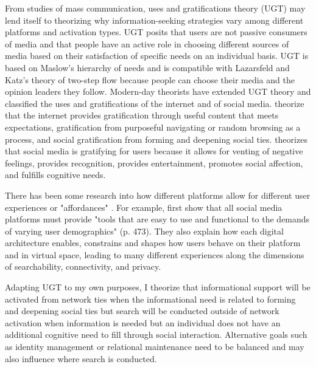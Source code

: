From studies of mass communication, uses and gratifications theory (UGT)
\citep{blumlerUsesMassCommunications1974, tanMassCommunicationTheories1985} may
lend itself to theorizing why information-seeking strategies vary among different
platforms and activation types. UGT posits that users are not passive
consumers of media and that people have an active role in choosing different
sources of media based on their satisfaction of specific needs on an individual
basis. UGT is based on Maslow's \citeyearpar{maslowTheoryHumanMotivation1943}
hierarchy of needs and is compatible with Lazarsfeld and Katz's theory of
two-step flow because people can choose their media and the opinion leaders they
follow. Modern-day theorists have extended UGT theory and classified the uses
and gratifications of the internet and of social media.
\citet{staffordDeterminingUsesGratifications2004} theorize that the internet
provides gratification through useful content that meets expectations,
gratification from purposeful navigating or random browsing as a process, and
social gratification from forming and deepening social ties.
\citet{leungGenerationalDifferencesContent2013} theorizes that social media is
gratifying for users because it allows for venting of negative feelings,
provides recognition, provides entertainment, promotes social affection, and
fulfills cognitive needs. 

There has been some research into how different platforms allow for different user 
experiences or "affordances" \citep{boyd2010social}. For example, \citet{bossetta18} first show
that all social media platforms must provide "tools that are easy to use and 
functional to the demands of varying user demographics" (p. 473). They also
explain how each digital architecture enables, constrains and shapes how users
behave on their platform and in virtual space, leading to many different experiences 
along the dimensions of searchability, connectivity, and privacy. 

Adapting UGT to my own purposes, I theorize that
informational support will be activated from network ties when the informational
need is related to forming and deepening social ties
\citep{baumeister,grieve2013face} but search will be conducted outside of network
activation when information is needed but an individual does not have an additional cognitive
need to fill through social interaction. Alternative goals such as identity
management or relational maintenance
\citep{brashersInformationSeekingAvoiding2002} need to be balanced and may also
influence where search is conducted.

